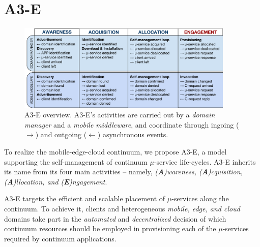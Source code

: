 \section{A3-E}\label{sec:A3-E}

\begin{figure}[tbp]
	\includegraphics[width=0.92\textwidth]{figs/A3-E-process}
	\caption{A3-E overview. A3-E's activities are carried out by a \textit{domain manager} and a \textit{mobile middleware}, and coordinate through ingoing ($\rightarrow$) and outgoing ($\leftarrow$) asynchronous events.}
	\label{fig:A3-E-process}
\end{figure}


To realize the mobile-edge-cloud continuum, we propose A3-E, a model supporting the self-management of continuum $\mu$-service life-cycles. A3-E inherits its name from its four main activities -- namely, \textit{(\textbf{A})wareness, (\textbf{A})cquisition, (\textbf{A})llocation, and (\textbf{E})ngagement}. 


A3-E targets 
the efficient and scalable placement of $\mu$-services along the continuum. 
To achieve it, clients and heterogeneous \textit{mobile, edge, and cloud} domains take part in the \textit{automated} and \textit{decentralized} decision of which continuum resources should be employed in provisioning each of the $\mu$-services required by continuum applications.%



